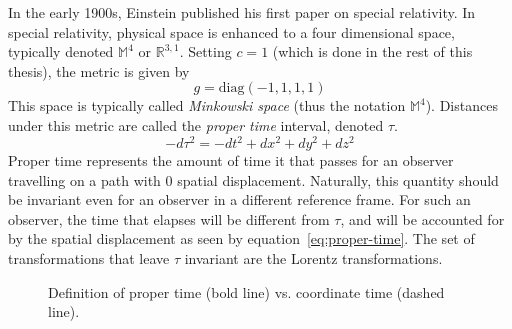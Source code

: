 In the early 1900s, Einstein published his first paper on special relativity. In special relativity, physical space is enhanced to a four dimensional space, typically denoted $\mathbb{M}^4$ or $\mathbb{R}^{3,1}$. Setting $c=1$ (which is done in the rest of this thesis), the metric is given by
\begin{equation}
    g = \mathrm{diag}(-1,1,1,1)
\end{equation}
This space is typically called \textit{Minkowski space} (thus the notation $\mathbb{M}^4$). Distances under this metric are called the \textit{proper time} interval, denoted $\tau$.
\begin{equation}\label{eq:proper-time}
    -d\tau^2 = -dt^2 + dx^2 + dy^2 + dz^2
\end{equation}
Proper time represents the amount of time it that passes for an observer travelling on a path with 0 spatial displacement. Naturally, this quantity should be invariant even for an observer in a different reference frame. For such an observer, the time that elapses will be different from $\tau$, and will be accounted for by the spatial displacement as seen by equation~\ref{eq:proper-time}. The set of transformations that leave $\tau$ invariant are the Lorentz transformations.
\begin{figure}
    \centering
    \caption{Definition of proper time (bold line) vs. coordinate time (dashed line).}
\end{figure}

